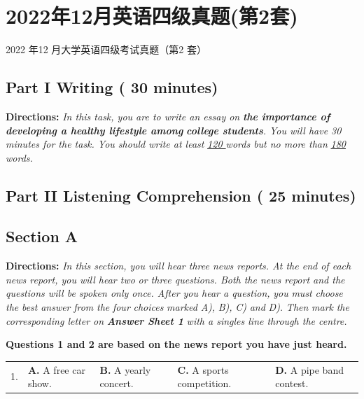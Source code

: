 \documentclass[UTF8,11pt]{ctexart}
\begin{document}
\section*{2022年12月英语四级真题(第2套)}
2022 年12 月大学英语四级考试真题（第2 套）


\subsection*{\textbf{Part I Writing} \textbf{( 30 minutes)}}


\textbf{Directions:}\textit{ In this task, you are to write an essay on }\textbf{\textit{the importance of developing a healthy lifestyle among}} \textbf{\textit{college students}}\textit{. You will have 30 minutes for the task. You should write at least }\textit{\uline{120 }}\textit{words but no more than} \textit{\uline{180 }}\textit{words.}


\subsection*{\textbf{Part II} \textbf{Listening Comprehension} \textbf{( 25 minutes)}}


\subsection*{\textbf{Section A}}


\textbf{Directions:} \textit{In this section, you will hear three news reports. At the end of each news report, you will hear two} \textit{or three questions. Both the news report and the questions will be spoken only once. After you hear a question,} \textit{you} \textit{must} \textit{choose} \textit{the} \textit{best} \textit{answer} \textit{from} \textit{the} \textit{four} \textit{choices} \textit{marked} \textit{A),} \textit{B),} \textit{C)} \textit{and} \textit{D).} \textit{Then} \textit{mark} \textit{the} \textit{corresponding letter on }\textbf{\textit{Answer Sheet 1}}\textit{ with a singles line through the centre.}


\textbf{Questions 1 and 2 are based on the news report you have just heard.}


\noindent\begin{tabularx}{\linewidth}{@{}lXXXX@{}}1. & \textbf{A.} A free car show. & \textbf{B.} A yearly concert. & \textbf{C.} A sports competition. & \textbf{D.} A pipe band contest.\\\end{tabularx}\par
\end{document}

